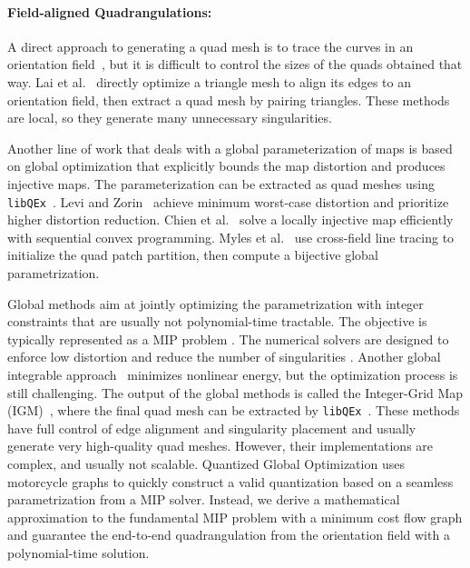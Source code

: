 \paragraph*{Field-aligned Quadrangulations:}
A direct approach to generating a quad mesh is to trace the curves in an orientation field~\cite{alliez2003anisotropic}, but it is difficult to control the sizes of the quads obtained that way. Lai et al.~\cite{lai2008incremental} directly optimize a triangle mesh to align its edges to an orientation field, then extract a quad mesh by pairing triangles. These methods are local, so they generate many unnecessary singularities.

Another line of work that deals with a global parameterization of maps is based on global optimization that explicitly bounds the map distortion and produces injective maps. The parameterization can be extracted as quad meshes using \texttt{libQEx}~\cite{ebke2013qex}. Levi and Zorin~\cite{levi2014strict} achieve minimum worst-case distortion and prioritize higher distortion reduction. Chien et al.~\cite{chien2016bounded} solve a locally injective map efficiently with sequential convex programming. Myles et al.~\cite{myles2014robust} use cross-field line tracing to initialize the quad patch partition, then compute a bijective global parametrization.

Global methods aim at jointly optimizing the parametrization with integer constraints that are usually not polynomial-time tractable. The objective is typically represented as a MIP problem \cite{bommes2009mixed}. The numerical solvers are designed to enforce low distortion and reduce the number of singularities \cite{bommes2013integer,myles2013controlled,levi2014strict,myles2014robust}. Another global integrable approach~\cite{diamanti2015integrable} minimizes nonlinear energy, but the optimization process is still challenging. The output of the global methods is called the Integer-Grid Map (IGM)~\cite{bommes2013integer}, where the final quad mesh can be extracted by \texttt{libQEx}~\cite{ebke2013qex}. These methods have full control of edge alignment and singularity placement and usually generate very high-quality quad meshes. However, their implementations are complex, and usually not scalable. Quantized Global Optimization \cite{Campen2015QGP} uses motorcycle graphs to quickly construct a valid quantization based on a seamless parametrization from a MIP solver. Instead, we derive a mathematical approximation to the fundamental MIP problem with a minimum cost flow graph and guarantee the end-to-end quadrangulation from the orientation field with a polynomial-time solution.


